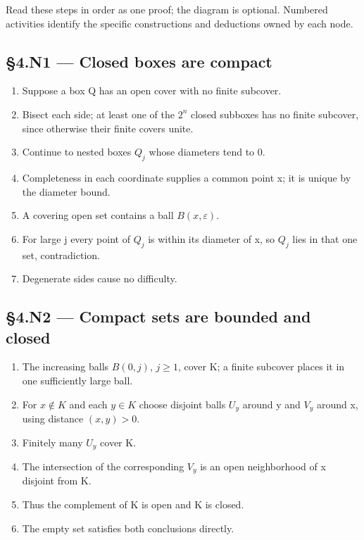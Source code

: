 \documentclass[preprint,12pt,aps,pra,showkeys,amsmath,amssymb,superscriptaddress,floatfix]{revtex4-2}
\theoremstyle{definition}
\theoremstyle{remark}
\begin{document}
Read these steps in order as one proof; the diagram is optional.
Numbered activities identify the specific constructions and deductions
owned by each node.

\subsection{§4.N1 --- Closed boxes are
compact}\label{n1-closed-boxes-are-compact}

\begin{enumerate}
\def\labelenumi{\arabic{enumi}.}
\item
  Suppose a box Q has an open cover with no finite subcover.
\item
  Bisect each side; at least one of the \(2^{n}\) closed subboxes has no
  finite subcover, since otherwise their finite covers unite.
\item
  Continue to nested boxes \(Q_j\) whose diameters tend to 0.
\item
  Completeness in each coordinate supplies a common point x; it is
  unique by the diameter bound.
\item
  A covering open set contains a ball \(B(x,\varepsilon )\).
\item
  For large j every point of \(Q_j\) is within its diameter of x, so
  \(Q_j\) lies in that one set, contradiction.
\item
  Degenerate sides cause no difficulty.
\end{enumerate}

\subsection{§4.N2 --- Compact sets are bounded and
closed}\label{n2-compact-sets-are-bounded-and-closed}

\begin{enumerate}
\def\labelenumi{\arabic{enumi}.}
\item
  The increasing balls \(B(0,j)\), \(j\ge 1\), cover K; a finite
  subcover places it in one sufficiently large ball.
\item
  For \(x\notin K\) and each \(y\in K\) choose disjoint balls \(U_y\)
  around y and \(V_y\) around x, using distance \((x,y)>0\).
\item
  Finitely many \(U_y\) cover K.
\item
  The intersection of the corresponding \(V_y\) is an open neighborhood
  of x disjoint from K.
\item
  Thus the complement of K is open and K is closed.
\item
  The empty set satisfies both conclusions directly.
\end{enumerate}
\end{document}
